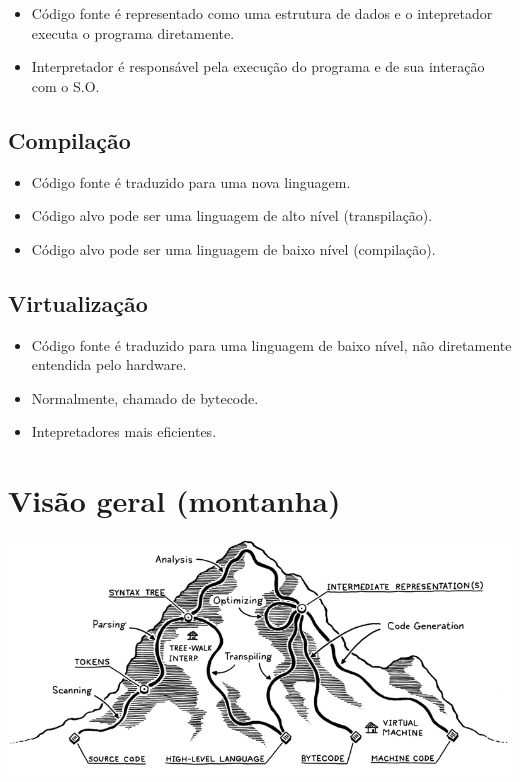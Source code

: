 \documentclass[11pt]{article}
\begin{document}
\begin{itemize}
\item Código fonte é representado como uma estrutura de dados e
o intepretador executa o programa diretamente.
\item Interpretador é responsável pela execução do programa e de
sua interação com o S.O.
\end{itemize}
\subsection*{Compilação}
\label{sec:orgaf676e0}

\begin{itemize}
\item Código fonte é traduzido para uma nova linguagem.
\item Código alvo pode ser uma linguagem de alto nível (transpilação).
\item Código alvo pode ser uma linguagem de baixo nível (compilação).
\end{itemize}
\subsection*{Virtualização}
\label{sec:org19f7c23}

\begin{itemize}
\item Código fonte é traduzido para uma linguagem de baixo nível, não diretamente entendida
pelo hardware.
\item Normalmente, chamado de bytecode.
\item Intepretadores mais eficientes.
\end{itemize}
\section*{Visão geral (montanha)}
\label{sec:org12377e8}

\begin{center}
\includegraphics[width=.9\linewidth]{ montain.png}
\end{center}
\end{document}
